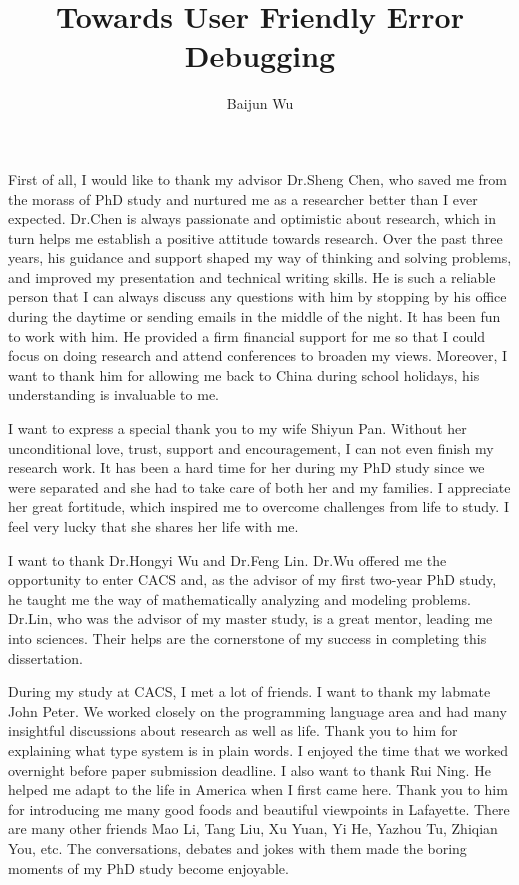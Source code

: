 \documentclass[12pt]{report}	%
\author{Baijun Wu}
\title{Towards User Friendly Error Debugging}
\begin{document}
\titlepage              %

\copyrightpage          %

\approvalpage           %

%
%
%

\begin{acknowledgments}		%

First of all, I would like to thank my advisor Dr.Sheng Chen, 
who saved me from the morass of PhD study and nurtured me as a researcher better than I ever expected.
%
Dr.Chen is always passionate and optimistic about research,
which in turn helps me establish a positive attitude towards research.
Over the past three years, his guidance and support shaped my way of thinking and solving problems,
and improved my presentation and technical writing skills.
%
He is such a reliable person that I can always discuss any questions with him 
by stopping by his office during the daytime or sending emails in the middle of the night.
It has been fun to work with him.
%
He provided a firm financial support for me 
so that I could focus on doing research and attend conferences to broaden my views.
Moreover, I want to thank him for allowing me back to China during school holidays,
his understanding is invaluable to me.

I want to express a special thank you to my wife Shiyun Pan.
Without her unconditional love, trust, support and encouragement,
I can not even finish my research work.
%
It has been a hard time for her during my PhD study since we were separated
and she had to take care of both her and my families.
I appreciate her great fortitude, which inspired me to overcome challenges from life to study. 
I feel very lucky that she shares her life with me.

I want to thank Dr.Hongyi Wu and Dr.Feng Lin.
Dr.Wu offered me the opportunity to enter CACS and,
as the advisor of my first two-year PhD study, 
he taught me the way of mathematically analyzing and modeling problems.
Dr.Lin, who was the advisor of my master study, is a great mentor, leading me into sciences.
Their helps are the cornerstone of my success in completing this dissertation.

During my study at CACS, I met a lot of friends. I want to thank my labmate John Peter.
We worked closely on the programming language area and had many insightful discussions about research as well as life.
Thank you to him for explaining what type system is in plain words.
I enjoyed the time that we worked overnight before paper submission deadline.
%
I also want to thank Rui Ning.
He helped me adapt to the life in America when I first came here.
Thank you to him for introducing me many good foods and beautiful viewpoints in Lafayette.
%
There are many other friends Mao Li, Tang Liu, Xu Yuan, Yi He, Yazhou Tu, Zhiqian You, etc.
The conversations, debates and jokes with them made the boring moments of my PhD study become enjoyable. 



\end{acknowledgments}
\end{document}
